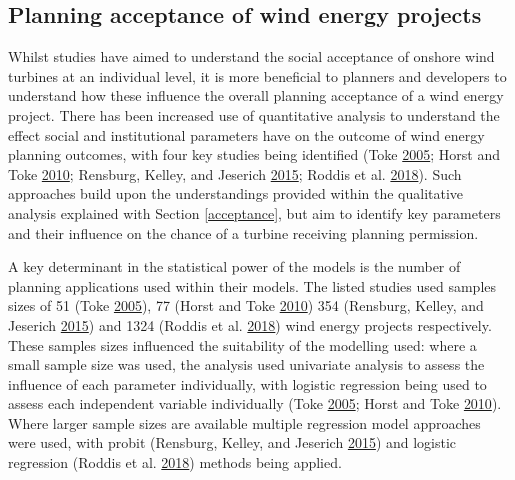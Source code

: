 \documentclass[a4paper,]{article}
\theoremstyle{definition}
\theoremstyle{definition}
\theoremstyle{definition}
\theoremstyle{remark}
\begin{document}
\hypertarget{planning-acceptance-of-wind-energy-projects}{%
\subsection{Planning acceptance of wind energy
projects}\label{planning-acceptance-of-wind-energy-projects}}

Whilst studies have aimed to understand the social acceptance of onshore
wind turbines at an individual level, it is more beneficial to planners
and developers to understand how these influence the overall planning
acceptance of a wind energy project. There has been increased use of
quantitative analysis to understand the effect social and institutional
parameters have on the outcome of wind energy planning outcomes, with
four key studies being identified (Toke
\protect\hyperlink{ref-Toke2005}{2005}; Horst and Toke
\protect\hyperlink{ref-VanderHorst2010}{2010}; Rensburg, Kelley, and
Jeserich \protect\hyperlink{ref-VanRensburg20}{2015}; Roddis et al.
\protect\hyperlink{ref-Roddis2018}{2018}). Such approaches build upon
the understandings provided within the qualitative analysis explained
with Section \ref{acceptance}, but aim to identify key parameters and
their influence on the chance of a turbine receiving planning
permission.

A key determinant in the statistical power of the models is the number
of planning applications used within their models. The listed studies
used samples sizes of 51 (Toke \protect\hyperlink{ref-Toke2005}{2005}),
77 (Horst and Toke \protect\hyperlink{ref-VanderHorst2010}{2010}) 354
(Rensburg, Kelley, and Jeserich
\protect\hyperlink{ref-VanRensburg20}{2015}) and 1324 (Roddis et al.
\protect\hyperlink{ref-Roddis2018}{2018}) wind energy projects
respectively. These samples sizes influenced the suitability of the
modelling used: where a small sample size was used, the analysis used
univariate analysis to assess the influence of each parameter
individually, with logistic regression being used to assess each
independent variable individually (Toke
\protect\hyperlink{ref-Toke2005}{2005}; Horst and Toke
\protect\hyperlink{ref-VanderHorst2010}{2010}). Where larger sample
sizes are available multiple regression model approaches were used, with
probit (Rensburg, Kelley, and Jeserich
\protect\hyperlink{ref-VanRensburg20}{2015}) and logistic regression
(Roddis et al. \protect\hyperlink{ref-Roddis2018}{2018}) methods being
applied.
\end{document}
